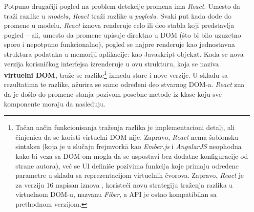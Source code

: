 Potpuno drugačiji pogled na problem detekcije promena ima \textsl{React}.
Umesto da traži razlike u \emph{modelu}, \textsl{React} traži razlike u \emph{pogledu}.
Svaki put kada dođe do promene u modelu, \textsl{React} iznova renderuje celo ili deo stabla koji predstavlja pogled -- ali, umesto da promene upisuje direktno u DOM (što bi bilo uzuzetno sporo i nepotpuno funkcionalno), pogled se najpre renderuje kao jednostavna struktura podataka u memoriji aplikacije: kao Javaskript objekat.
Kada se nova verzija korisničkog interfejsa izrenderuje u ovu strukturu, koja se naziva \textbf{virtuelni DOM}, traže se razlike\footnote{Tačan način funkcionisanja traženja razlika je implementacioni detalj, ali činjenica da se koristi virtuelni DOM nije. Zapravo, \textsl{React} nema šablonsku sintaksu (koja je u slučaju frejmvork\=a kao \textsl{Ember.js} i \textsl{AngularJS} neophodna kako bi veza sa DOM-om mogla da se uspostavi bez dodatne konfiguracije od strane autora), već se UI definiše pozivima funkcija koje primaju određene parametre u skladu sa reprezentacijom virtuelnih čvorova. Zapravo, \textsl{React} je za verziju 16 napisan iznova \cite{what-is-react-fiber}, koristeći novu strategiju traženja razlika u virtuelnom DOM-u, nazvanu \textit{Fiber}, a API je ostao kompatibilan sa prethodnom verzijom.} između stare i nove verzije.
U skladu sa rezultatima te razlike, ažurira se samo određeni deo stvarnog DOM-a.
\textsl{React} zna da je došlo do promene stanja pozivom posebne metode iz klase koju sve komponente moraju da nasleđuju.
 